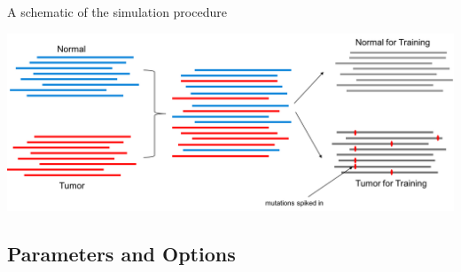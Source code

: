 \documentclass[10pt,letterpaper]{article}
\begin{document}
\begin{sloppypar}
A schematic of the simulation procedure

\begin{center}
 \includegraphics[width=6.5in]{../somaticseq/utilities/dockered_pipelines/bamSimulator/onkoinsight_sim.png}
\end{center}


\subsection{Parameters and Options}


\end{sloppypar}
\end{document}
